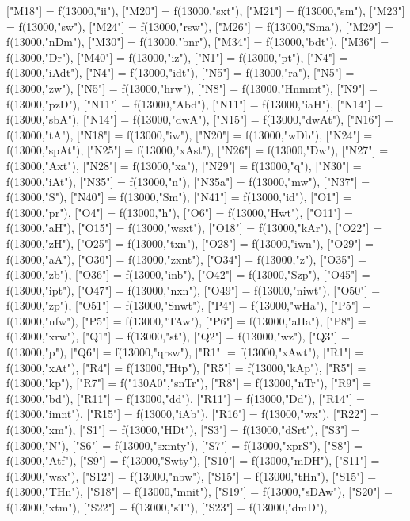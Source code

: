 \documentclass{article}
\begin{document}
\begin{luacode*}
{	["M18"] = f(13000,"ii"),
	["M20"] = f(13000,"sxt"),
	["M21"] = f(13000,"sm"),
	["M23"] = f(13000,"sw"),
	["M24"] = f(13000,"rsw"),
	["M26"] = f(13000,"Sma"),
	["M29"] = f(13000,"nDm"),
	["M30"] = f(13000,"bnr"),
	["M34"] = f(13000,"bdt"),
	["M36"] = f(13000,"Dr"),
	["M40"] = f(13000,"iz"),
	["N1"] = f(13000,"pt"),
	["N4"] = f(13000,"iAdt"),
	["N4"] = f(13000,"idt"),
	["N5"] = f(13000,"ra"),
	["N5"] = f(13000,"zw"),
	["N5"] = f(13000,"hrw"),
	["N8"] = f(13000,"Hnmmt"),
	["N9"] = f(13000,"pzD"),
	["N11"] = f(13000,"Abd"),
	["N11"] = f(13000,"iaH"),
	["N14"] = f(13000,"sbA"),
	["N14"] = f(13000,"dwA"),
	["N15"] = f(13000,"dwAt"),
	["N16"] = f(13000,"tA"),
	["N18"] = f(13000,"iw"),
	["N20"] = f(13000,"wDb"),
	["N24"] = f(13000,"spAt"),
	["N25"] = f(13000,"xAst"),
	["N26"] = f(13000,"Dw"),
	["N27"] = f(13000,"Axt"),
	["N28"] = f(13000,"xa"),
	["N29"] = f(13000,"q"),
	["N30"] = f(13000,"iAt"),
	["N35"] = f(13000,"n"),
	["N35a"] = f(13000,"mw"),
	["N37"] = f(13000,"S"),
	["N40"] = f(13000,"Sm"),
	["N41"] = f(13000,"id"),
	["O1"] = f(13000,"pr"),
	["O4"] = f(13000,"h"),
	["O6"] = f(13000,"Hwt"),
	["O11"] = f(13000,"aH"),
	["O15"] = f(13000,"wsxt"),
	["O18"] = f(13000,"kAr"),
	["O22"] = f(13000,"zH"),
	["O25"] = f(13000,"txn"),
	["O28"] = f(13000,"iwn"),
	["O29"] = f(13000,"aA"),
	["O30"] = f(13000,"zxnt"),
	["O34"] = f(13000,"z"),
	["O35"] = f(13000,"zb"),
	["O36"] = f(13000,"inb"),
	["O42"] = f(13000,"Szp"),
	["O45"] = f(13000,"ipt"),
	["O47"] = f(13000,"nxn"),
	["O49"] = f(13000,"niwt"),
	["O50"] = f(13000,"zp"),
	["O51"] = f(13000,"Snwt"),
	["P4"] = f(13000,"wHa"),
	["P5"] = f(13000,"nfw"),
	["P5"] = f(13000,"TAw"),
	["P6"] = f(13000,"aHa"),
	["P8"] = f(13000,"xrw"),
	["Q1"] = f(13000,"st"),
	["Q2"] = f(13000,"wz"),
	["Q3"] = f(13000,"p"),
	["Q6"] = f(13000,"qrsw"),
	["R1"] = f(13000,"xAwt"),
	["R1"] = f(13000,"xAt"),
	["R4"] = f(13000,"Htp"),
	["R5"] = f(13000,"kAp"),
	["R5"] = f(13000,"kp"),
	["R7"] = f("130A0","snTr"),
	["R8"] = f(13000,"nTr"),
	["R9"] = f(13000,"bd"),
	["R11"] = f(13000,"dd"),
	["R11"] = f(13000,"Dd"),
	["R14"] = f(13000,"imnt"),
	["R15"] = f(13000,"iAb"),
	["R16"] = f(13000,"wx"),
	["R22"] = f(13000,"xm"),
	["S1"] = f(13000,"HDt"),
	["S3"] = f(13000,"dSrt"),
	["S3"] = f(13000,"N"),
	["S6"] = f(13000,"sxmty"),
	["S7"] = f(13000,"xprS"),
	["S8"] = f(13000,"Atf"),
	["S9"] = f(13000,"Swty"),
	["S10"] = f(13000,"mDH"),
	["S11"] = f(13000,"wsx"),
	["S12"] = f(13000,"nbw"),
	["S15"] = f(13000,"tHn"),
	["S15"] = f(13000,"THn"),
	["S18"] = f(13000,"mnit"),
	["S19"] = f(13000,"sDAw"),
	["S20"] = f(13000,"xtm"),
	["S22"] = f(13000,"sT"),
	["S23"] = f(13000,"dmD"),
}
\end{luacode*}
\end{document}
